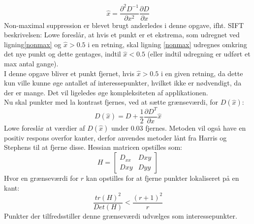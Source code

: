 \begin{equation}
\hat{x}= \dfrac{\partial^2 D^{-1}}{\partial x^2}\dfrac{\partial D}{\partial x}
\end{equation}
Non-maximal suppression er blevet brugt anderledes i denne opgave, ifht. SIFT beskrivelsen: Lowe foreslår, at hvis et punkt er et ekstrema, som udregnet ved ligning\ref{nonmax} og $\hat{x} > 0.5$ i en retning, skal ligning \ref{nonmax} udregnes omkring det nye punkt og dette gentages, indtil $\hat{x} < 0.5$ (eller indtil udregning er udført et max antal gange).
\\
I denne opgave bliver et punkt fjernet, hvis $\hat{x} > 0.5$ i en given retning, da dette kun ville kunne øge antallet af interessepunkter, hvilket ikke er nødvendigt, da der er mange. Det vil ligeledes øge kompleksiteten af applikationen.
\\
Nu skal punkter med la kontrast fjernes, ved at sætte grænseværdi, for $D(\hat{x})$:
\begin{equation}
D(\hat{x})=D+\dfrac{1}{2}\dfrac{\partial D^T}{\partial x}\hat{x}
\end{equation}
Lowe foreslår at værdier af $D(\hat{x})$ under 0.03 fjernes. Metoden vil også have en positiv respons overfor kanter, derfor anvendes metoder lånt fra Harris og Stephens \cite{harris} til at fjerne disse. Hessian matricen opstilles som:
\begin{equation}
H =
\begin{bmatrix}
D_{xx} & D{xy} \\
D{xy} & D{yy}
\end{bmatrix}
\end{equation}
Hvor en grænseværdi for $r$ kan opstilles for at fjerne punkter lokaliseret på en kant:
\begin{equation}
\dfrac{tr(H)^2}{Det(H)}<\dfrac{(r+1)^2}{r}
\end{equation}
Punkter der tilfredsstiller denne grænseværdi udvælges som interessepunkter. 
